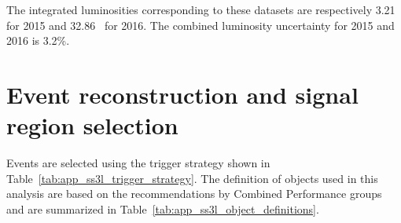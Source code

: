 The integrated luminosities corresponding to these datasets are respectively 3.21~{\ifb} for 2015 and 32.86~{\ifb} for 2016.
The combined luminosity uncertainty for 2015 and 2016 is 3.2\%.


\section{Event reconstruction and signal region selection}
\label{app:ss3l_event_reconstruction_and_SR_selection}
Events are selected using the trigger strategy shown in Table~\ref{tab:app_ss3l_trigger_strategy}.
The definition of objects used in this analysis are based on the recommendations by Combined Performance groups and are summarized in Table~\ref{tab:app_ss3l_object_definitions}.

\begin{table}[htbp]
    \caption{The trigger strategy used in the same-sign or three leptons and jets analysis.}
    \label{tab:app_ss3l_trigger_strategy}
\end{table}%


